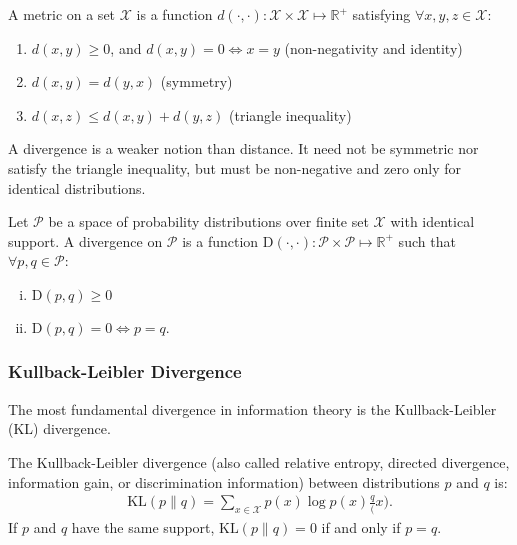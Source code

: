 \begin{definition}
	A \textnormal{\sffamily metric} on a set $\mathcal{X}$ is a function $d(\cdot, \cdot): \mathcal{X} \times \mathcal{X} \mapsto \mathbb{R}^+$ satisfying $\forall x, y, z \in \mathcal{X}$:
	\begin{enumerate}
		\item $d(x, y) \geq 0$, and $d(x, y) = 0 \iff x = y$ (non-negativity and identity)
		\item $d(x, y) = d(y, x)$ (symmetry)
		\item $d(x, z) \leq d(x, y) + d(y, z)$ (triangle inequality)
	\end{enumerate}
\end{definition}

\begin{remark}
	A divergence is a weaker notion than distance. It need not be symmetric nor satisfy the triangle inequality, but must be non-negative and zero only for identical distributions.
\end{remark}

\begin{definition}
	Let $\mathcal{P}$ be a space of probability distributions over finite set $\mathcal{X}$ with identical support. A \textnormal{\sffamily divergence} on $\mathcal{P}$ is a function $\text{D}(\cdot, \cdot): \mathcal{P} \times \mathcal{P} \mapsto \mathbb{R}^+$ such that $\forall p, q \in \mathcal{P}$:
	\begin{enumerate}[(i)]
		\item $\text{D}(p, q) \geq 0$
		\item $\text{D}(p, q) = 0 \iff p = q$.
	\end{enumerate}
\end{definition}

\subsubsection{Kullback-Leibler Divergence}
The most fundamental divergence in information theory is the Kullback-Leibler (KL) divergence.

\begin{definition}%
	\label{def:kl-divergence}
	The \textnormal{\sffamily Kullback-Leibler divergence} (also called \textnormal{\sffamily relative entropy}, \textnormal{\textsf directed divergence}, \textnormal{\sffamily information gain}, or \textnormal{\sffamily discrimination information}) between distributions $p$ and $q$ is:
	\begin{align}
		\label{eq:KL}
		\text{KL}(p \| q) = \sum_{x \in \mathcal{X}} p(x) \log{p(x) \frac q(x)}.
	\end{align}
	If $p$ and $q$ have the same support, $\text{KL}(p \| q) = 0$ if and only if $p = q$.
\end{definition}

